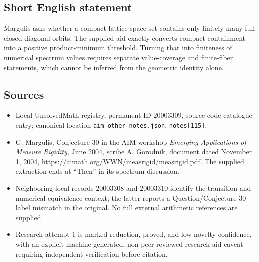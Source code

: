 \documentclass[11pt]{article}
\begin{document}
\subsection{Short English statement}
Margulis asks whether a compact lattice-space set contains only finitely many full closed diagonal orbits. The supplied aid exactly converts compact containment into a positive product-minimum threshold. Turning that into finiteness of numerical spectrum values requires separate value-coverage and finite-fiber statements, which cannot be inferred from the geometric identity alone.
\subsection{Sources}
\begin{itemize}
\item Local UnsolvedMath registry, permanent ID $20003309$, source code catalogue entry; canonical location \texttt{aim-other-notes.json}, \texttt{notes[115]}.
\item G. Margulis, Conjecture 30 in the AIM workshop \emph{Emerging Applications of Measure Rigidity}, June 2004, scribe A. Gorodnik, document dated November 1, 2004, \url{https://aimath.org/WWN/measrigid/measrigid.pdf}. The supplied extraction ends at ``Then'' in its spectrum discussion.
\item Neighboring local records $20003308$ and $20003310$ identify the transition and numerical-equivalence context; the latter reports a Question/Conjecture-30 label mismatch in the original. No full external arithmetic references are supplied.
\item Research attempt 1 is marked reduction, proved, and low novelty confidence, with an explicit machine-generated, non-peer-reviewed research-aid caveat requiring independent verification before citation.
\end{itemize}
\end{document}
